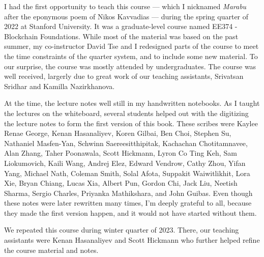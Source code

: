 I had the first opportunity to teach this course --- which I nicknamed
\emph{Marabu} after the eponymous poem of Nikos Kavvadias --- during the
spring quarter of 2022 at Stanford University. It was a graduate-level course
named EE374 - Blockchain Foundations. While most of the material was
based on the past summer, my co-instructor David Tse and I redesigned
parts of the course to meet the time constraints of the quarter system,
and to include some new material. To our surprise, the course was mostly
attended by undergraduates.
The course was well received,
largerly due to great work of our teaching assistants, Srivatsan Sridhar
and Kamilla Nazirkhanova.

At the time, the lecture notes well still
in my handwritten notebooks. As I taught the lectures on the whiteboard,
several students helped out with the digitizing the lecture notes to
form the first version of this book. These scribes were
Kaylee Renae George, Kenan Hasanaliyev, Koren Gilbai,
Ben Choi, Stephen Su, Nathaniel Masfen-Yan,
Schwinn Saereesitthipitak, Kachachan Chotitamnavee, Alan Zhang,
Taher Poonawala, Scott Hickmann,
Lyron Co Ting Keh, Sam Liokumovich,
Kaili Wang, Andrej Elez,
Edward Vendrow, Cathy Zhou,
Yifan Yang,
Michael Nath, Coleman Smith,
Solal Afota,
Suppakit Waiwitlikhit, Lora Xie,
Bryan Chiang, Lucas Xia,
Albert Pun, Gordon Chi,
Jack Liu,
Neetish Sharma, Sergio Charles,
Priyanka Mathikshara, and John Guibas.
Even though these notes were later rewritten many times,
I'm deeply grateful to all, because they made the first version happen,
and it would not have started without them.

We repeated this course during winter quarter of 2023.
There, our teaching assistants were Kenan Hasanaliyev
and Scott Hickmann who further helped refine the course material and notes.
